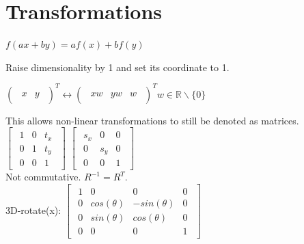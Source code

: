 \section{Transformations}
$f(ax + by) = af(x) + bf(y)$

 Raise dimensionality by 1 and set its coordinate to 1. 
\begin{center}
$
\begin{pmatrix}
    \begin{smallmatrix} 
        x & y 
    \end{smallmatrix} 
\end{pmatrix}^T \leftrightarrow 
\begin{pmatrix}
    \begin{smallmatrix} 
        xw & yw & w 
    \end{smallmatrix} 
\end{pmatrix}^T
w \in \mathbb{R}\backslash\{0\}
$
\end{center}
This allows non-linear transformations to still be denoted as matrices. \\
    $\begin{bmatrix}
        \begin{smallmatrix}
            1 & 0 & t_x \\
            0 & 1 & t_y \\
            0 & 0 & 1
        \end{smallmatrix}
    \end{bmatrix}$
$\begin{bmatrix}
    \begin{smallmatrix}
        s_x & 0 & 0 \\
        0 & s_y & 0 \\
        0 & 0 & 1
    \end{smallmatrix}
\end{bmatrix}$ \\
Not commutative. $R^{-1} = R^T$. \\
3D-rotate(x):
$\begin{bmatrix}
    \begin{smallmatrix}
        1 & 0 & 0 & 0 \\
        0 & cos(\theta) & -sin(\theta) & 0 \\
        0 & sin(\theta) & cos(\theta) & 0\\
        0 & 0 & 0 & 1
    \end{smallmatrix}
\end{bmatrix}$\\
